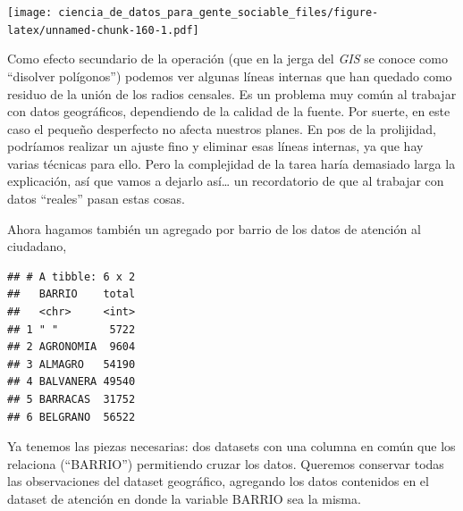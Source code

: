 \documentclass[]{book}
\newenvironment{Shaded}{\begin{snugshade}}{\end{snugshade}}
\newcommand{\KeywordTok}[1]{\textcolor[rgb]{0.13,0.29,0.53}{\textbf{#1}}}
\newcommand{\DataTypeTok}[1]{\textcolor[rgb]{0.13,0.29,0.53}{#1}}
\newcommand{\StringTok}[1]{\textcolor[rgb]{0.31,0.60,0.02}{#1}}
\newcommand{\OperatorTok}[1]{\textcolor[rgb]{0.81,0.36,0.00}{\textbf{#1}}}
\newcommand{\NormalTok}[1]{#1}
\begin{document}
\texttt{[image: ciencia\_de\_datos\_para\_gente\_sociable\_files/figure-latex/unnamed-chunk-160-1.pdf]}

Como efecto secundario de la operación (que en la jerga del \emph{GIS}
se conoce como ``disolver polígonos'') podemos ver algunas líneas
internas que han quedado como residuo de la unión de los radios
censales. Es un problema muy común al trabajar con datos geográficos,
dependiendo de la calidad de la fuente. Por suerte, en este caso el
pequeño desperfecto no afecta nuestros planes. En pos de la prolijidad,
podríamos realizar un ajuste fino y eliminar esas líneas internas, ya
que hay varias técnicas para ello. Pero la complejidad de la tarea haría
demasiado larga la explicación, así que vamos a dejarlo así\ldots{} un
recordatorio de que al trabajar con datos ``reales'' pasan estas cosas.

Ahora hagamos también un agregado por barrio de los datos de atención al
ciudadano,

\begin{Shaded}
\end{Shaded}

\begin{verbatim}
## # A tibble: 6 x 2
##   BARRIO    total
##   <chr>     <int>
## 1 " "        5722
## 2 AGRONOMIA  9604
## 3 ALMAGRO   54190
## 4 BALVANERA 49540
## 5 BARRACAS  31752
## 6 BELGRANO  56522
\end{verbatim}

Ya tenemos las piezas necesarias: dos datasets con una columna en común
que los relaciona (``BARRIO'') permitiendo cruzar los datos. Queremos
conservar todas las observaciones del dataset geográfico, agregando los
datos contenidos en el dataset de atención en donde la variable BARRIO
sea la misma.

\begin{Shaded}
\end{Shaded}
\end{document}
